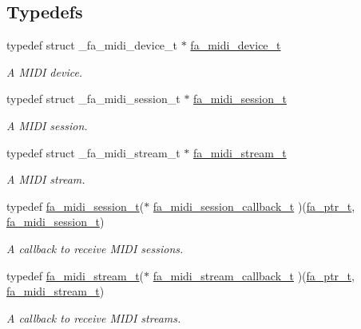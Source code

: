 \subsection*{Typedefs}
\begin{DoxyCompactItemize}
\item 
typedef struct \-\_\-fa\-\_\-midi\-\_\-device\-\_\-t $\ast$ \hyperlink{group___fa_midi_gabbbfd1ec30a186768ba2744e46bacc9b}{fa\-\_\-midi\-\_\-device\-\_\-t}
\begin{DoxyCompactList}\small\item\em A M\-I\-D\-I device. \end{DoxyCompactList}\item 
typedef struct \-\_\-fa\-\_\-midi\-\_\-session\-\_\-t $\ast$ \hyperlink{group___fa_midi_ga222964548b932c6f53b575b23629530e}{fa\-\_\-midi\-\_\-session\-\_\-t}
\begin{DoxyCompactList}\small\item\em A M\-I\-D\-I session. \end{DoxyCompactList}\item 
typedef struct \-\_\-fa\-\_\-midi\-\_\-stream\-\_\-t $\ast$ \hyperlink{group___fa_midi_ga85772039b62d8bb718a51e1ffbbb2fa2}{fa\-\_\-midi\-\_\-stream\-\_\-t}
\begin{DoxyCompactList}\small\item\em A M\-I\-D\-I stream. \end{DoxyCompactList}\item 
typedef \hyperlink{group___fa_midi_ga222964548b932c6f53b575b23629530e}{fa\-\_\-midi\-\_\-session\-\_\-t}($\ast$ \hyperlink{group___fa_midi_ga20fb39192d8af433b1506a529bc981e7}{fa\-\_\-midi\-\_\-session\-\_\-callback\-\_\-t} )(\hyperlink{group___fa_ga915ddeae99ad7568b273d2b876425197}{fa\-\_\-ptr\-\_\-t}, \hyperlink{group___fa_midi_ga222964548b932c6f53b575b23629530e}{fa\-\_\-midi\-\_\-session\-\_\-t})
\begin{DoxyCompactList}\small\item\em A callback to receive M\-I\-D\-I sessions. \end{DoxyCompactList}\item 
typedef \hyperlink{group___fa_midi_ga85772039b62d8bb718a51e1ffbbb2fa2}{fa\-\_\-midi\-\_\-stream\-\_\-t}($\ast$ \hyperlink{group___fa_midi_ga8022098ffcf993ccdaed068b97ab7bfc}{fa\-\_\-midi\-\_\-stream\-\_\-callback\-\_\-t} )(\hyperlink{group___fa_ga915ddeae99ad7568b273d2b876425197}{fa\-\_\-ptr\-\_\-t}, \hyperlink{group___fa_midi_ga85772039b62d8bb718a51e1ffbbb2fa2}{fa\-\_\-midi\-\_\-stream\-\_\-t})
\begin{DoxyCompactList}\small\item\em A callback to receive M\-I\-D\-I streams. \end{DoxyCompactList}\item 

\end{DoxyCompactItemize}
